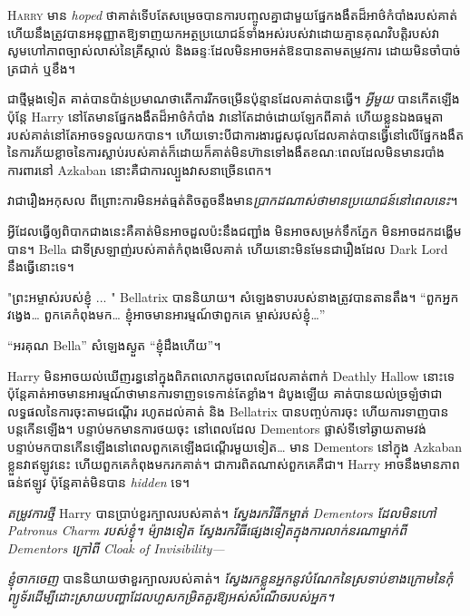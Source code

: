 
\lettrine{H}{arry} មាន \emph{hoped} ថាគាត់ទើបតែសម្រេចបានការបញ្ចូលគ្នាជាមួយផ្នែកងងឹតដ៏អាថ៌កំបាំងរបស់គាត់ ហើយនឹងត្រូវបានអនុញ្ញាតឱ្យទាញយកអត្ថប្រយោជន៍ទាំងអស់របស់វាដោយគ្មានគុណវិបត្តិរបស់វា សូមហៅភាពច្បាស់លាស់នៃគ្រីស្តាល់ និងឆន្ទៈដែលមិនអាចអត់ឱនបានតាមតម្រូវការ ដោយមិនចាំបាច់ត្រជាក់ ឬខឹង។

ជា​ថ្មី​ម្តង​ទៀត គាត់​បាន​ប៉ាន់​ប្រមាណ​ថា​តើ​ការ​រីក​ចម្រើន​ប៉ុន្មាន​ដែល​គាត់​បាន​ធ្វើ។ \emph{អ្វីមួយ} បានកើតឡើង ប៉ុន្តែ Harry នៅតែមានផ្នែកងងឹតដ៏អាថ៌កំបាំង វានៅតែដាច់ដោយឡែកពីគាត់ ហើយខ្លួនឯងធម្មតារបស់គាត់នៅតែអាចទទួលយកបាន។ ហើយទោះបីជាការងារជួសជុលដែលគាត់បានធ្វើនៅលើផ្នែកងងឹតនៃការភ័យខ្លាចនៃការស្លាប់របស់គាត់ក៏ដោយក៏គាត់មិនហ៊ានទៅងងឹតខណៈពេលដែលមិនមានរបាំងការពារនៅ Azkaban នោះគឺជាការល្បួងវាសនាច្រើនពេក។

វាជារឿងអកុសល ពីព្រោះការមិនអត់ធ្មត់តិចតួចនឹងមាន\emph{ប្រាកដណាស់ថាមានប្រយោជន៍នៅពេលនេះ}។

អ្វី​ដែល​ធ្វើ​ឲ្យ​ពិបាក​ជាង​នេះ​គឺ​គាត់​មិន​អាច​ដួល​ប៉ះ​នឹង​ជញ្ជាំង មិន​អាច​សម្រក់​ទឹកភ្នែក មិន​អាច​ដក​ដង្ហើម​បាន។ Bella ជា​ទី​ស្រឡាញ់​របស់​គាត់​កំពុង​មើល​គាត់ ហើយ​នោះ​មិន​មែន​ជា​រឿង​ដែល​ Dark Lord នឹង​ធ្វើ​នោះ​ទេ។

"ព្រះអម្ចាស់របស់ខ្ញុំ ... " Bellatrix បាននិយាយ។ សំឡេងទាបរបស់នាងត្រូវបានតានតឹង។ “ពួកអ្នកវង្វេង… ពួកគេកំពុងមក… ខ្ញុំអាចមានអារម្មណ៍ថាពួកគេ ម្ចាស់របស់ខ្ញុំ…”

“អរគុណ Bella” សំឡេងស្ងួត “ខ្ញុំដឹងហើយ”។

Harry មិន​អាច​យល់​ឃើញ​រន្ធ​នៅ​ក្នុង​ពិភពលោក​ដូច​ពេល​ដែល​គាត់​ពាក់ Deathly Hallow នោះ​ទេ ប៉ុន្តែ​គាត់​អាច​មាន​អារម្មណ៍​ថា​មាន​ការ​ទាញ​ទទេ​កាន់​តែ​ខ្លាំង។ ដំបូង​ឡើយ គាត់​បាន​យល់​ច្រឡំ​ថា​ជា​លទ្ធផល​នៃ​ការ​ចុះ​តាម​ជណ្ដើរ រហូត​ដល់​គាត់ និង Bellatrix បាន​បញ្ចប់​ការ​ចុះ ហើយ​ការ​ទាញ​បាន​បន្ត​កើនឡើង។ បន្ទាប់មកមានការថយចុះ នៅពេលដែល Dementors ផ្លាស់ទីទៅឆ្ងាយតាមវង់ បន្ទាប់មកបានកើនឡើងនៅពេលពួកគេឡើងជណ្តើរមួយទៀត… មាន Dementors នៅក្នុង Azkaban ខ្លួនវាឥឡូវនេះ ហើយពួកគេកំពុងមករកគាត់។ ជាការពិតណាស់ពួកគេគឺជា។ Harry អាច​នឹង​មាន​ភាព​ធន់​ឥឡូវ ប៉ុន្តែ​គាត់​មិន​បាន \emph{hidden} ទេ។

\emph{តម្រូវការថ្មី} Harry បានប្រាប់ខួរក្បាលរបស់គាត់។ \emph{ស្វែងរកវិធីកម្ចាត់ Dementors ដែលមិនហៅ Patronus Charm របស់ខ្ញុំ។ ម៉្យាងទៀត ស្វែងរកវិធីផ្សេងទៀតក្នុងការលាក់នរណាម្នាក់ពី Dementors ក្រៅពី Cloak of Invisibility—}

\emph{ខ្ញុំចាកចេញ} បាននិយាយថាខួរក្បាលរបស់គាត់។ \emph{ស្វែងរកខ្លួនអ្នកនូវបំណែកនៃស្រទាប់ខាងក្រោមនៃកុំព្យូទ័រដើម្បីដោះស្រាយបញ្ហាដែលហួសកម្រិតគួរឱ្យអស់សំណើចរបស់អ្នក។}


